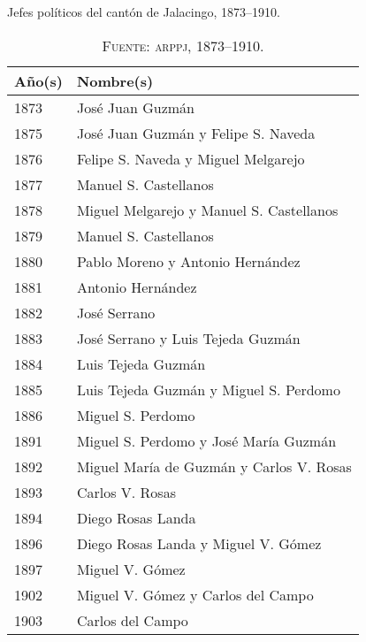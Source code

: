 \documentclass[14pt,twoside,final]{extbook} %
\begin{document}
\begin{table}
\centering
\caption[Jefes políticos del cantón de Jalacingo, 1873--1910]{Jefes políticos del cantón de Jalacingo, 1873--1910.}
\lfstyle
\begin{tabular}{@{}ll@{}}
\toprule
Año(s) & Nombre(s) \\
\midrule
1873 & José Juan Guzmán\index[nombres]{Guzman, Jose Juan@Guzmán, José Juan!jefe político} \\
1875 & José Juan Guzmán y Felipe S. Naveda\index[nombres]{Naveda, Felipe S.!jefe político} \\
1876 & Felipe S. Naveda y Miguel Melgarejo\index[nombres]{Melgarejo, Miguel!jefe político} \\
1877 & Manuel S. Castellanos\index[nombres]{Castellanos, Manuel S.!jefe político} \\
1878 & Miguel Melgarejo y Manuel S. Castellanos \\
1879 & Manuel S. Castellanos \\
1880 & Pablo Moreno\index[nombres]{Moreno, Pablo!jefe político} y Antonio Hernández\index[nombres]{Hernandez, Antonio@Hernández, Antonio!jefe político} \\
1881 & Antonio Hernández \\
1882 & José Serrano\index[nombres]{Serrano, Jose@Serrano, José!jefe político} \\
1883 & José Serrano y Luis Tejeda Guzmán\index[nombres]{Tejeda Guzman, Luis@Tejeda Guzmán, Luis!jefe político} \\
1884 & Luis Tejeda Guzmán \\
1885 & Luis Tejeda Guzmán y Miguel S. Perdomo\index[nombres]{Perdomo, Miguel S.!jefe político} \\
1886\capitaldash 1890 & Miguel S. Perdomo \\
1891 & Miguel S. Perdomo y José María Guzmán\index[nombres]{Guzman, Jose Maria@Guzmán, José María!jefe político} \\
1892 & Miguel María de Guzmán\index[nombres]{Guzman, Miguel Maria de@Guzmán, Miguel María de!jefe político} y Carlos V. Rosas\index[nombres]{Vera Rosas, Carlos!jefe político} \\
1893 & Carlos V. Rosas \\
1894\capitaldash 1895 & Diego Rosas Landa\index[nombres]{Rosas Landa, Diego!jefe político} \\
1896 & Diego Rosas Landa y Miguel V. Gómez\index[nombres]{Gomez, Miguel V.@Gómez, Miguel V.!jefe político} \\
1897\capitaldash 1901 & Miguel V. Gómez \\
1902 & Miguel V. Gómez y Carlos del Campo\index[nombres]{Campo, Carlos del!jefe político} \\
1903\capitaldash 1910 & Carlos del Campo \\
\bottomrule
\end{tabular}
\caption*{\textsc{Fuente:} \textsc{arppj}, 1873--1910.}
\label{tab:jefes-politicos}
\end{table}
\end{document}
